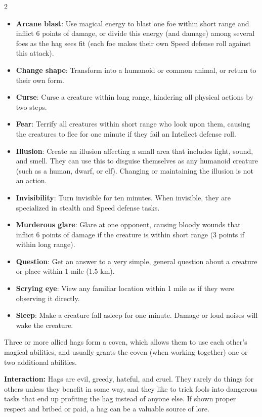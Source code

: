 \begin{multicols}{2}
\begin{itemize}
\item \textbf{Arcane blast}: Use magical energy to blast one foe within short range and inflict 6 points of damage, or divide this energy (and damage) among several foes as the hag sees fit (each foe makes their own Speed defense roll against this attack). 
\item \textbf{Change shape}: Transform into a humanoid or common animal, or return to their own form. 
\item \textbf{Curse}: Curse a creature within long range, hindering all physical actions by two steps. 
\item \textbf{Fear}: Terrify all creatures within short range who look upon them, causing the creatures to flee for one minute if they fail an Intellect defense roll. 
\item \textbf{Illusion}: Create an illusion affecting a small area that includes light, sound, and smell. They can use this to disguise themselves as any humanoid creature (such as a human, dwarf, or elf). Changing or maintaining the illusion is not an action. 
\item \textbf{Invisibility}: Turn invisible for ten minutes. When invisible, they are specialized in stealth and Speed defense tasks. 
\item \textbf{Murderous glare}: Glare at one opponent, causing bloody wounds that inflict 6 points of damage if the creature is within short range (3 points if within long range). 
\item \textbf{Question}: Get an answer to a very simple, general question about a creature or place within 1 mile (1.5 km). 
\item \textbf{Scrying eye}: View any familiar location within 1 mile as if they were observing it directly. 
\item \textbf{Sleep}: Make a creature fall asleep for one minute. Damage or loud noises will wake the creature. 
\end{itemize}

Three or more allied hags form a coven, which allows them to use each other’s magical abilities, and usually grants the coven (when working together) one or two additional abilities. 

\textbf{Interaction:} Hags are evil, greedy, hateful, and cruel. They rarely do things for others unless they benefit in some way, and they like to trick fools into dangerous tasks that end up profiting the hag instead of anyone else. If shown proper respect and bribed or paid, a hag can be a valuable source of lore. 


\end{multicols}
